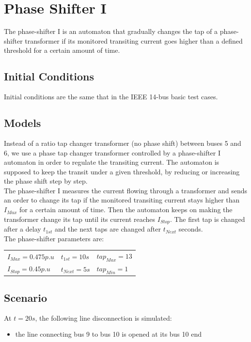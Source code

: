 \documentclass[a4paper, 12pt]{report}
\begin{document}
\section{Phase Shifter I}
\label{PhaseShifterIAutomaton}

The phase-shifter I is an automaton that gradually changes the tap of a phase-shifter transformer if its monitored transiting current goes higher than a defined threshold for a certain amount of time.

\subsection{Initial Conditions}

Initial conditions are the same that in the IEEE 14-bus basic test cases.

\subsection{Models}

Instead of a ratio tap changer transformer (no phase shift) between buses 5 and 6, we use a phase tap changer transformer controlled by a phase-shifter I automaton in order to regulate the transiting current.
The automaton is supposed to keep the transit under a given threshold, by reducing or increasing the phase shift step by step. \\

The phase-shifter I measures the current flowing through a transformer and sends an order to change its tap if the monitored transiting current stays higher than $I_{Max}$ for a certain amount of time. Then the automaton keeps on making the transformer change its tap until its current reaches $I_{Stop}$. The first tap is changed after a delay $t_{1st}$ and the next taps are changed after $t_{Next}$ seconds. \\

The phase-shifter parameters are:
\begin{center}
\begin{tabular}{l|l|l}
   $I_{Max}=0.475p.u$ & $t_{1st}=10s$ & $tap_{Max}=13$ \\
   $I_{Stop}=0.45p.u$  & $t_{Next}=5s$ & $tap_{Min}=1$ \\
\end{tabular}
\end{center}

\subsection{Scenario}
At $t=20s$, the following line disconnection is simulated:
\begin{itemize}
\item{the line connecting bus 9 to bus 10 is opened at its bus 10 end}
\end{itemize}
\end{document}
